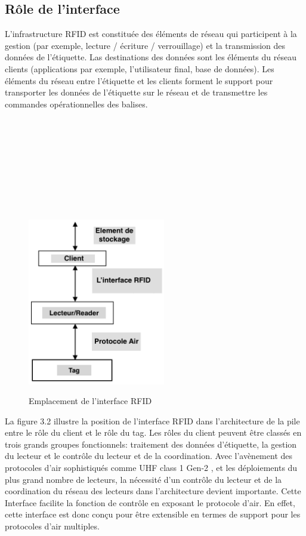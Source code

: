 \documentclass[11pt, a4paper, twoside]{book}
\begin{document}
\subsection{Rôle de l'interface}
L'infrastructure RFID est constituée des éléments de réseau qui participent à la gestion (par exemple, lecture / écriture / verrouillage) et la transmission des données de l'étiquette. Las destinations des données sont les éléments du réseau clients (applications par exemple, l'utilisateur final, base de données). Les éléments du réseau entre l'étiquette et les clients forment le support pour transporter les données de l'étiquette sur le réseau et de transmettre les commandes opérationnelles des balises.\\\\\\\\\\\\\\\\\\
\begin{figure}[H]
\centering
\includegraphics[width=6cm,height=8cm]{orga}
\caption{Emplacement de l'interface RFID}
\end{figure}

La figure 3.2 illustre la position de l'interface RFID dans l'architecture de la pile entre le rôle du client et le rôle du tag. Les rôles du client peuvent être classés en trois grands groupes fonctionnels: traitement des données d'étiquette, la gestion du lecteur et le contrôle du lecteur et de la coordination. Avec l'avènement des protocoles d'air sophistiqués comme UHF class 1 Gen-2 \cite{air}, et les déploiements du plus grand nombre de lecteurs, la nécessité d'un contrôle du lecteur et de la coordination  du réseau des lecteurs dans l'architecture devient importante.
Cette Interface facilite la fonction de contrôle en exposant le protocole d'air. En effet, cette interface est donc conçu pour être extensible en termes de support pour les protocoles d'air multiples.\\
\end{document}
